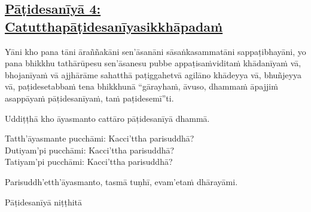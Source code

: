 \subsection*{\hyperref[ack4]{Pāṭidesanīyā 4: Catutthapāṭidesanīyasikkhāpadaṁ}}
\label{pd4}
Yāni kho pana tāni āraññakāni sen'āsanāni sāsaṅkasammatāni sappaṭibhayāni, yo pana bhikkhu tathārūpesu sen'āsanesu pubbe appaṭisaṁviditaṁ khādanīyaṁ vā, bhojanīyaṁ vā ajjhārāme sahatthā paṭiggahetvā agilāno khādeyya vā, bhuñjeyya vā, paṭidesetabbaṁ tena bhikkhunā “gārayhaṁ, āvuso, dhammaṁ āpajjiṁ asappāyaṁ pāṭidesanīyaṁ, taṁ paṭidesemī”ti.

\medskip

\begin{center}
Uddiṭṭhā kho āyasmanto cattāro pāṭidesanīyā dhammā.

\smallskip

Tatth'āyasmante pucchāmi: Kacci'ttha parisuddhā?\\
Dutiyam'pi pucchāmi: Kacci'ttha parisuddhā?\\
Tatiyam'pi pucchāmi: Kacci'ttha parisuddhā?

\smallskip

Parisuddh'etth'āyasmanto, tasmā tuṇhī, evam'etaṁ dhārayāmi.
\end{center}

\begin{outro}
  Pāṭidesanīyā niṭṭhitā
\end{outro}

\clearpage
